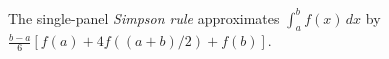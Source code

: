 
The single-panel \emph{Simpson rule} approximates $\int_a^bf(x)\,dx$ by $\frac{b-a}{6}[f(a)+4f((a+b)/2)+f(b)]$.
